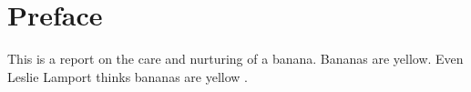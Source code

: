 \chapter{Preface}

This is a report on the care and nurturing of a \gls{banana}.
Bananas are yellow. 
Even Leslie Lamport thinks bananas are yellow \cite{cardelli}.
